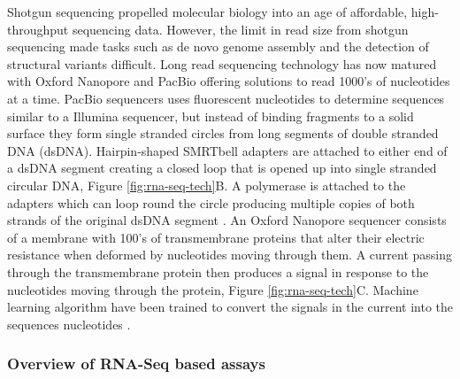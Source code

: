 \documentclass[../main.tex]{subfiles}
\begin{document}
Shotgun sequencing propelled molecular biology into an age of affordable, high-throughput sequencing data.
However, the limit in read size from shotgun sequencing made tasks such as de novo genome assembly and the detection of structural variants difficult.
Long read sequencing technology has now matured with Oxford Nanopore and PacBio offering solutions to read 1000's of nucleotides at a time. 
PacBio sequencers uses fluorescent nucleotides to determine sequences similar to a Illumina sequencer, but instead of binding fragments to a solid surface they form single stranded circles from long segments of double stranded DNA (dsDNA).
Hairpin-shaped SMRTbell adapters are attached to either end of a dsDNA segment creating a closed loop that is opened up into single stranded circular DNA, Figure \ref{fig:rna-seq-tech}B. 
A polymerase is attached to the adapters which can loop round the circle producing multiple copies of both strands of the original dsDNA segment \parencite{Hu2021}.
An Oxford Nanopore sequencer consists of a membrane with 100's of transmembrane proteins that alter their electric resistance when deformed by nucleotides moving through them.  
A current passing through the transmembrane protein then produces a signal in response to the nucleotides moving through the protein, Figure \ref{fig:rna-seq-tech}C.
Machine learning algorithm have been trained to convert the signals in the current into the sequences nucleotides \parencite{Jain2016}.

\subsubsection{Overview of RNA-Seq based assays}
\end{document}
